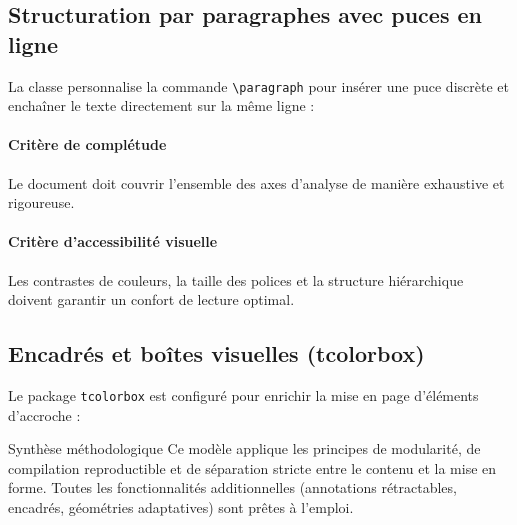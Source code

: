 \subsection{Structuration par paragraphes avec puces en ligne}
\label{subsec:paragraphes}

La classe personnalise la commande \texttt{\textbackslash paragraph} pour insérer une puce discrète et enchaîner le texte directement sur la même ligne :

\paragraph{Critère de complétude}
Le document doit couvrir l'ensemble des axes d'analyse de manière exhaustive et rigoureuse.

\paragraph{Critère d'accessibilité visuelle}
Les contrastes de couleurs, la taille des polices et la structure hiérarchique doivent garantir un confort de lecture optimal.

\subsection{Encadrés et boîtes visuelles (tcolorbox)}
\label{subsec:boites}

Le package \texttt{tcolorbox} est configuré pour enrichir la mise en page d'éléments d'accroche :

\begin{boiteSynthese}{Synthèse méthodologique}
  Ce modèle applique les principes de modularité, de compilation reproductible et de séparation stricte entre le contenu et la mise en forme.
  Toutes les fonctionnalités additionnelles (annotations rétractables, encadrés, géométries adaptatives) sont prêtes à l'emploi.
\end{boiteSynthese}
